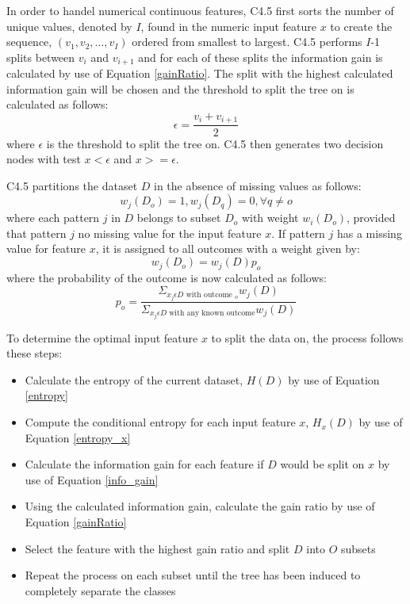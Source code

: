 \documentclass[10pt, conference]{IEEEtran}
\begin{document}
In order to handel numerical continuous features, C4.5 first sorts the number of unique values, denoted by $I$,
found in the numeric input feature $x$ to create the sequence, $(v_1,v_2,...,v_I)$ ordered from smallest to largest.
C4.5 performs $I$-1 splits between $v_i$ and $v_{i+1}$ and for each of these splits the information gain is calculated by use of
Equation \eqref{gainRatio}. The split with the highest calculated information gain will be chosen and the threshold to
split the tree on is calculated as follows:
\begin{equation}
    \epsilon = \frac{v_i + v_{i+1}}{2}\label{numeric}
\end{equation}
where $\epsilon$ is the threshold to split the tree on. C4.5 then generates two decision nodes with test $x < \epsilon$ and $x >= \epsilon$.

C4.5 partitions the dataset $D$ in the absence of missing values as follows: 
\begin{equation}
    w_j(D_o) = 1, w_j(D_q)=0, \forall q \neq o \label{no_missing}
\end{equation}
where each pattern $j$ in $D$ belongs to subset $D_o$ with weight $w_i(D_o)$, provided that pattern $j$ no missing value for the input
feature $x$. If pattern $j$ has a missing value for feature $x$, it is assigned to all outcomes with a weight given by:
\begin{equation}
    w_j(D_o) = w_j(D)p_o \label{with_missing}
\end{equation}
where the probability of the outcome is now calculated as follows:
\begin{equation}
    p_o = \frac{\Sigma_{x_j \epsilon D \text{ with outcome } _o} w_j(D)}{\Sigma_{x_j \epsilon D \text{ with any known outcome}} w_j(D)}
\end{equation}

To determine the optimal input feature $x$ to split the data on, the process follows these steps:
\begin{itemize}
    \item Calculate the entropy of the current dataset, $H(D)$ by use of Equation \eqref{entropy}
    \item Compute the conditional entropy for each input feature $x$, $H_x(D)$ by use of Equation \eqref{entropy_x}
    \item Calculate the information gain for each feature if $D$ would be split on $x$ by use of Equation \eqref{info_gain}
    \item Using the calculated information gain, calculate the gain ratio by use of Equation \eqref{gainRatio}
    \item Select the feature with the highest gain ratio and split $D$ into $O$ subsets
    \item Repeat the process on each subset until the tree has been induced to completely separate the classes
\end{itemize}
\end{document}

